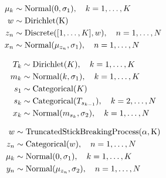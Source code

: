 \begin{equation}
  \label{eq:gmm}
  \begin{aligned}
    \mu_{k} &\sim \mathrm{Normal}(0, \sigma_{1}), \quad k = 1, \ldots, K \\
    w &\sim \mathrm{Dirichlet(K)} \\
    z_{n} &\sim \mathrm{Discrete}([1, \ldots, K], w), \quad n = 1, \ldots, N \\
    x_{n} &\sim \mathrm{Normal}(\mu_{z_{n}}, \sigma_{1}), \quad n = 1, \ldots, N
  \end{aligned}
\end{equation}

\begin{equation}
  \label{eq:hmm}
  \begin{aligned}
    T_{k} &\sim \mathrm{Dirichlet}(K), \quad k = 1, \ldots, K \\
    m_{k} &\sim \mathrm{Normal}(k, \sigma_{1}), \quad k = 1, \ldots, K \\
    s_{1} &\sim \mathrm{Categorical}(K) \\
    s_{k} &\sim \mathrm{Categorical}(T_{s_{k-1}}), \quad k = 2, \ldots, N \\
    x_{k} &\sim \mathrm{Normal}(m_{s_{k}}, \sigma_{2}), \quad k = 1, \ldots, N
  \end{aligned}
\end{equation}

\begin{equation}
  \label{eq:imm}
  \begin{aligned}
    w &\sim \mathrm{TruncatedStickBreakingProcess(\alpha, K)} \\
    z_{n} &\sim \mathrm{Categorical}(w), \quad n = 1, \ldots, N \\
    \mu_{k} &\sim \mathrm{Normal}(0, \sigma_{1}), \quad k = 1, \ldots, K \\
    y_{n} &\sim \mathrm{Normal}(\mu_{z_{n}}, \sigma_{2}), \quad n = 1, \ldots, N
  \end{aligned}
\end{equation}







